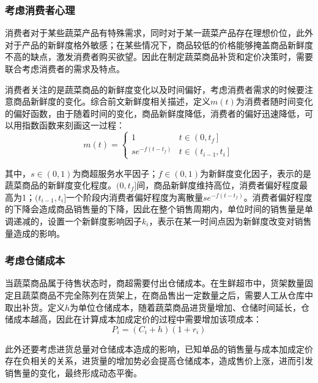 \documentclass{my_paper}
\begin{document}
\subsubsection{考虑消费者心理}
消费者对于某些蔬菜产品有特殊需求，同时对于某一蔬菜产品存在理想价位，此外对于产品的新鲜度格外敏感；在某些情况下，商品较低的价格能够掩盖商品新鲜度不高的缺点，激发消费者购买欲望。因此在制定蔬菜商品补货和定价决策时，需要联合考虑消费者的需求及特点。

消费者关注的是蔬菜商品的新鲜度变化以及时间偏好，考虑消费者需求的时候要注意商品新鲜度的变化。综合前文新鲜度相关描述，定义$m(t)$为消费者随时间变化的偏好函数，由于随着时间的变化，商品新鲜度降低，消费者的偏好迅速降低，可以用指数函数来刻画这一过程：
\begin{equation}
m(t)=\left\{\begin{array}{cl}
1 & t \in\left(0, t_f\right] \\
s e^{-f\left(t-t_f\right)} & t \in\left(t_{i-1}, t_i\right]
\end{array}\right.
\end{equation}

其中，$s \in (0,1)$为商超服务水平因子；$f \in (0,1)$为新鲜度变化因子，表示的是蔬菜商品的新鲜度变化程度。$(0,t_f]$间，商品新鲜度维持高位，消费者偏好程度最高为1；$(t_{i-1},t_i]$一个阶段内消费者偏好程度为离散量$s e^{-f\left(t-t_f\right)}$。消费者偏好程度的下降会造成商品销售量的下降，因此在整个销售周期内，单位时间的销售量是单调递减的，设置一个新鲜度影响因子$k_i$，表示在某一时间点因为新鲜度改变对销售量造成的影响。

\subsubsection{考虑仓储成本}
当蔬菜商品属于待售状态时，商超需要付出仓储成本。在生鲜超市中，货架数量固定且蔬菜商品不完全陈列在货架上，在商品售出一定数量之后，需要人工从仓库中取出补货。定义$h$为单位仓储成本，随着蔬菜商品进货量增加、仓储时间延长，仓储成本越高，因此在计算成本加成定价的过程中需要增加该项成本：
\begin{equation}
    P_i=(C_i+h)(1+r_i)
\end{equation}

此外还要考虑进货总量对仓储成本造成的影响，已知单品的销售量与成本加成定价存在负相关的关系，进货量的增加势必会提高仓储成本，造成售价上涨，进而引发销售量的变化，最终形成动态平衡。
\end{document}
